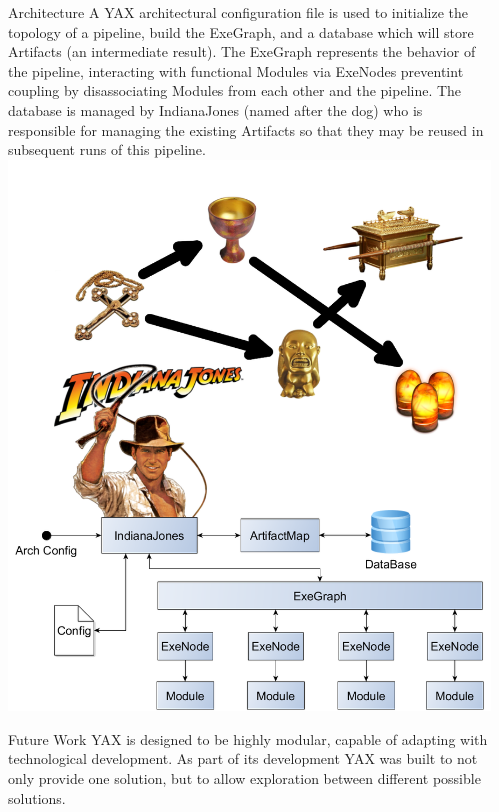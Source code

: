 \documentclass[final,t]{beamer}
\begin{document}
\begin{frame}{}
\begin{columns}[t]
\begin{column}{.3\linewidth}
    \end{column}


    \begin{column}{.3\linewidth}
        \begin{block}{Architecture}
            A YAX architectural configuration file is used to initialize the topology of a pipeline, build the
            ExeGraph, and a database which will store Artifacts (an intermediate result).
            The ExeGraph represents the behavior of the pipeline, interacting with functional Modules via ExeNodes preventint
            coupling by disassociating Modules from each other and the pipeline. The database is managed by IndianaJones
            (named after the dog) who is responsible for managing the existing
            Artifacts so that they may be reused in subsequent runs of this pipeline. \newline
            \includegraphics[width=.95\linewidth]{assets/arch}
        \end{block}

        \begin{block}{Future Work}
            YAX is designed to be highly modular, capable of adapting with technological development. As part of its development
            YAX was built to not only provide one solution, but to allow exploration between different possible solutions.


\end{block}
\end{column}
\end{columns}
\end{frame}
\end{document}
